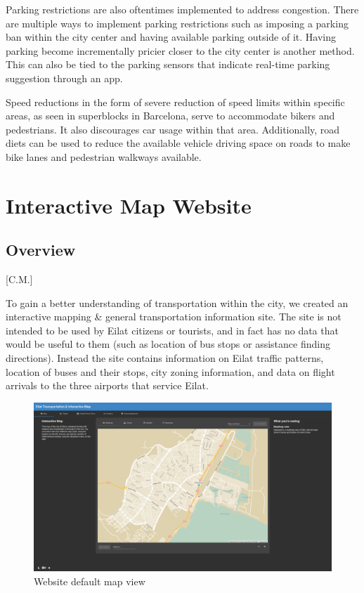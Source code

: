 \documentclass[12pt]{article}                       %
\begin{document}
Parking restrictions are also oftentimes implemented to address congestion. There are multiple ways to implement parking restrictions such as imposing a parking ban within the city center and having available parking outside of it. Having parking become incrementally pricier closer to the city center is another method. This can also be tied to the parking sensors that indicate real-time parking suggestion through an app.

Speed reductions in the form of severe reduction of speed limits within specific areas, as seen in superblocks in Barcelona, serve to accommodate bikers and pedestrians. It also discourages car usage within that area. Additionally, road diets can be used to reduce the available vehicle driving space on roads to make bike lanes and pedestrian walkways available.


\newpage
\section{Interactive Map Website}
\subsection{Overview}[C.M.]

To gain a better understanding of transportation within the city, we created an interactive mapping \& general transportation information site. The site is not intended to be used by Eilat citizens or tourists, and in fact has no data that would be useful to them (such as location of bus stops or assistance finding directions). Instead the site contains information on Eilat traffic patterns, location of buses and their stops, city zoning information, and data on flight arrivals to the three airports that service Eilat. 

\begin{figure}[H]
    \centering
    \includegraphics[width=12cm]{images/site_map.png}
    \caption{Website default map view}
    \label{img:site_map}
\end{figure}
\end{document}
